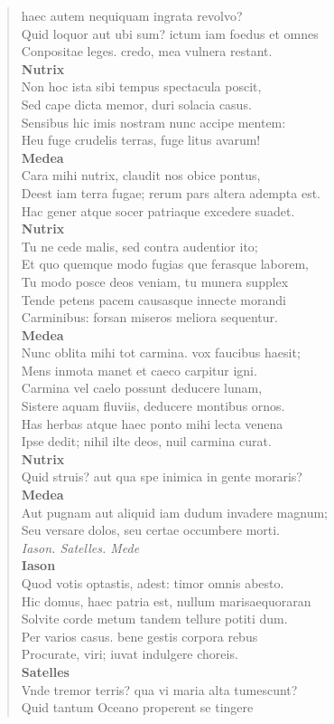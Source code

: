 \documentclass[11pt, a4paper]{report}
\begin{document}
\begin{verse}
{haec autem nequiquam ingrata revolvo? \\ Quid loquor aut ubi sum? ictum iam foedus et omnes \\ Conpositae leges. credo, mea vulnera restant. \\ \textbf{Nutrix} \\Non hoc ista sibi tempus spectacula poscit, \\ Sed cape dicta memor, duri solacia casus. \\ Sensibus hic imis nostram nunc accipe mentem: \\ Heu fuge crudelis terras, fuge litus avarum! \\ \textbf{Medea} \\Cara mihi nutrix, claudit nos obice pontus, \\ Deest iam terra fugae; rerum pars altera adempta est. \\ Hac gener atque socer patriaque excedere suadet. \\ \textbf{Nutrix} \\Tu ne cede malis, sed contra audentior ito; \\ Et quo quemque modo fugias \lbrack que \rbrack  ferasque laborem, \\ Tu modo posce deos veniam, tu munera supplex \\ Tende petens pacem causasque innecte morandi \\ Carminibus: forsan miseros meliora sequentur. \\ \textbf{Medea} \\Nunc oblita mihi tot carmina. \rbrack  vox faucibus haesit; \\ Mens inmota manet et caeco carpitur igni. \\ Carmina vel caelo possunt deducere lunam, \\ Sistere aquam fluviis, deducere montibus ornos. \\ Has herbas atque haec ponto mihi lecta venena \\ Ipse dedit; nihil ilte deos, nuil carmina curat. \\ \textbf{Nutrix} \\Quid struis? aut qua spe inimica in gente moraris? \\ \textbf{Medea} \\Aut pugnam aut aliquid iam dudum invadere magnum; \\ Seu versare dolos, seu certae occumbere morti. \\ \textit{Iason. Satelles. Mede} \\ \textbf{Iason} \\Quod votis optastis, adest: timor omnis abesto. \\ Hic domus, haec patria est, nullum marisaequoraran \\ Solvite corde metum tandem tellure potiti  \lbrack dum. \\ Per varios casus. bene gestis corpora rebus \\ Procurate, viri; iuvat indulgere choreis. \\ \textbf{Satelles} \\Vnde tremor terris? qua vi maria alta tumescunt? \\ Quid tantum Oceano properent se tingere }
\end{verse}
\end{document}
